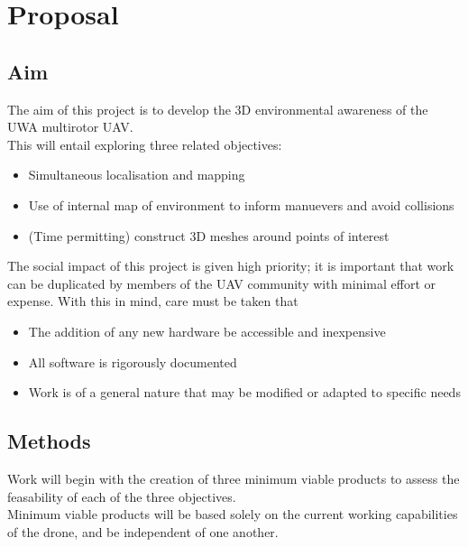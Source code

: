 \documentclass[a4paper, 12pt, titlepage]{article}
\begin{document}


\section{Proposal}
	\subsection{Aim}
	The aim of this project is to develop the 3D environmental awareness of the UWA multirotor UAV.
	\\This will entail exploring three related objectives:
	\begin{itemize}
  		\item Simultaneous localisation and mapping
  		\item Use of internal map of environment to inform manuevers and avoid collisions
  		\item (Time permitting) construct 3D meshes around points of interest
	\end{itemize}
	The social impact of this project is given high priority; it is important that work can be duplicated by members of the UAV community with minimal effort or expense. With this in mind, care must be taken that \begin{itemize}
  		\item The addition of any new hardware be accessible and inexpensive
  		\item All software is rigorously documented
  		\item Work is of a general nature that may be modified or adapted to specific needs
	\end{itemize}
	
	\subsection{Methods}
	Work will begin with the creation of three minimum viable products to assess the feasability of each of the three objectives.
	\\Minimum viable products will be based solely on the current working capabilities of the drone, and be independent of one another.
	
\end{document}
